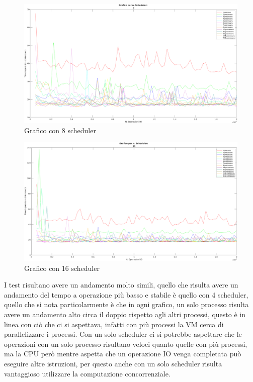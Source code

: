 \begin{figure}[!htp]
    \centering
    \includegraphics[keepaspectratio=true,scale=0.33]{images/matlab/concorrenza_io/8_IO.png}
	\caption{Grafico con 8 scheduler}
  	\label{fig:8_schedulerIO}
\end{figure}

\begin{figure}[!htp]
    \centering
    \includegraphics[keepaspectratio=true,scale=0.33]{images/matlab/concorrenza_io/16_IO.png}
	\caption{Grafico con 16 scheduler}
  	\label{fig:16_schedulerIO}
\end{figure}

I test risultano avere un andamento molto simili, quello che risulta
avere un andamento del tempo a operazione più basso e stabile
è quello con 4 scheduler, quello che si nota particolarmente
è che in ogni grafico,
un solo processo risulta avere un andamento alto circa il
doppio rispetto agli altri processi, questo è in linea con ciò che
ci si aspettava, infatti con più processi la VM cerca di parallelizzare
i processi. Con un solo scheduler ci si potrebbe aspettare che
le operazioni con un solo processo risultano veloci quanto
quelle con più processi, ma la CPU però mentre aspetta
che un operazione IO venga completata può eseguire altre istruzioni,
per questo anche con un solo scheduler risulta vantaggioso
utilizzare la computazione concorrenziale.

